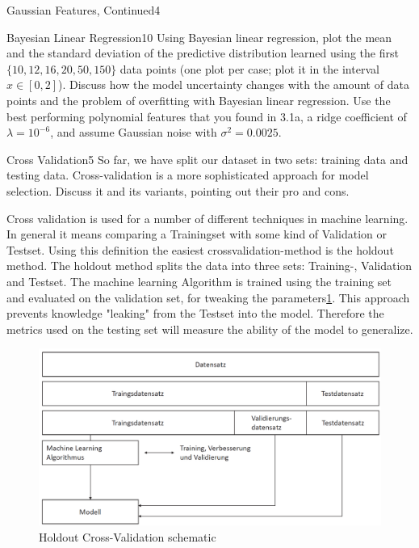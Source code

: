 \begin{questions}
\begin{question}{Gaussian Features, Continued}{4}
\end{question}


\begin{question}{Bayesian Linear Regression}{10}
Using Bayesian linear regression, plot the mean and the standard deviation of the predictive distribution learned using the first $\{10, 12, 16, 20, 50, 150\}$ data points (one plot per case; plot it in the interval $x\in[0,2]$).
Discuss how the model uncertainty changes with the amount of data points and the problem of overfitting with Bayesian linear regression.
Use the best performing polynomial features that you found in 3.1a, a ridge coefficient of $\lambda=10^{-6}$, and assume Gaussian noise with $\sigma^2=0.0025$. 

\begin{answer}\end{answer}
\end{question}


\begin{question}[bonus]{Cross Validation}{5}
So far, we have split our dataset in two sets: training data and testing data. Cross-validation is a more sophisticated approach for model selection. Discuss it and its variants, pointing out their pro and cons.
\end{question}


Cross validation is used for a number of different techniques in machine learning. In general it means comparing a Trainingset with some kind of Validation or Testset. Using this definition the easiest crossvalidation-method is the holdout method. The holdout method splits the data into three sets: Training-, Validation and Testset. The machine learning Algorithm is trained using the training set and evaluated on the validation set, for tweaking the parameters\ref{fig:holdout}. This approach prevents knowledge "leaking" from the Testset into the model. Therefore the metrics used on the testing set will measure the ability of the model to generalize. 
\begin{figure}[H]
	\includegraphics[width=0.7\linewidth]{pictures/holdout.png}
	\centering
	\caption{Holdout Cross-Validation schematic}
	\label{fig:holdout}
\end{figure}




\end{questions}
